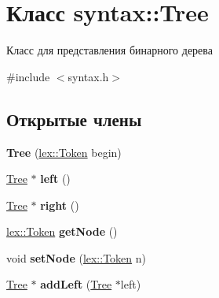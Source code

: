 \hypertarget{classsyntax_1_1_tree}{}\section{Класс syntax\+:\+:Tree}
\label{classsyntax_1_1_tree}


Класс для представления бинарного дерева  




{\ttfamily \#include $<$syntax.\+h$>$}

\subsection*{Открытые члены}
\begin{DoxyCompactItemize}
\item 
\mbox{\label{classsyntax_1_1_tree_aeaae486212d10ef23cc657804d19159d}} 
{\bfseries Tree} (\mbox{\hyperlink{classlex_1_1_token}{lex\+::\+Token}} begin)
\item 
\mbox{\label{classsyntax_1_1_tree_a35dfe4f67b2f6d5ba1d9ad6a01e38a0b}} 
\mbox{\hyperlink{classsyntax_1_1_tree}{Tree}} $\ast$ {\bfseries left} ()
\item 
\mbox{\label{classsyntax_1_1_tree_a544e001c84acdd3da947f9d3966982df}} 
\mbox{\hyperlink{classsyntax_1_1_tree}{Tree}} $\ast$ {\bfseries right} ()
\item 
\mbox{\label{classsyntax_1_1_tree_a10d2cab861e566c6dd1e3ce4521ad686}} 
\mbox{\hyperlink{classlex_1_1_token}{lex\+::\+Token}} {\bfseries get\+Node} ()
\item 
\mbox{\label{classsyntax_1_1_tree_a657fa1c700dd3181b9017a9e9b36ff4b}} 
void {\bfseries set\+Node} (\mbox{\hyperlink{classlex_1_1_token}{lex\+::\+Token}} n)
\item 
\mbox{\label{classsyntax_1_1_tree_a1ee861b34fbcbac16b49d735d0ce6de2}} 
\mbox{\hyperlink{classsyntax_1_1_tree}{Tree}} $\ast$ {\bfseries add\+Left} (\mbox{\hyperlink{classsyntax_1_1_tree}{Tree}} $\ast$left)
\item 
\mbox{\label{classsyntax_1_1_tree_a4da83c9ec960bd8fa59a7badca83cf14}} 

\end{DoxyCompactItemize}
